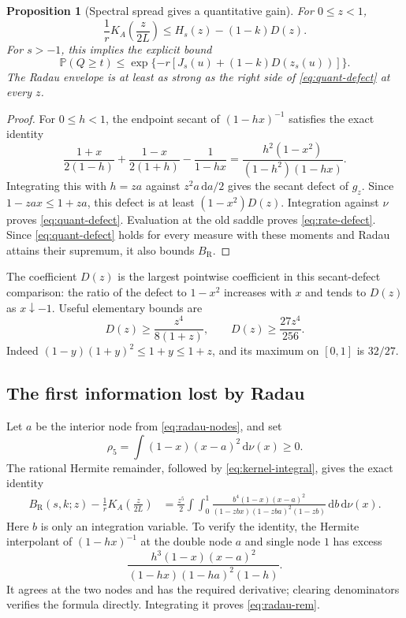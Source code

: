 \documentclass[11pt,letterpaper]{article}
\numberwithin{equation}{section}
\newtheorem{proposition}[theorem]{Proposition}
\theoremstyle{definition}\newtheorem{definition}[theorem]{Definition}
\theoremstyle{remark}\newtheorem{remark}[theorem]{Remark}
\newcommand{\PP}{\mathbb P}
\newcommand{\dd}{\,\mathrm d}
\newcommand{\bRad}{B_{\mathrm R}}
\begin{document}
\begin{proposition}[Spectral spread gives a quantitative gain]
\label{prop:defect}
For $0\le z<1$,
\begin{equation}\label{eq:quant-defect}
 \frac1r K_A\left(\frac z{2L}\right)
 \le H_s(z)-(1-k)D(z).
\end{equation}
For $s>-1$, this implies the explicit bound
\begin{equation}\label{eq:rate-defect}
 \PP(Q\ge t)\le
 \exp\{-r[J_s(u)+(1-k)D(z_s(u))]\}.
\end{equation}
The Radau envelope is at least as strong as the right side of
\eqref{eq:quant-defect} at every $z$.
\end{proposition}
\begin{proof}
For $0\le h<1$, the endpoint secant of $(1-hx)^{-1}$ satisfies
the exact identity
\[
 \frac{1+x}{2(1-h)}+\frac{1-x}{2(1+h)}-\frac1{1-hx}
 =\frac{h^2(1-x^2)}{(1-h^2)(1-hx)}.
\]
Integrating this with $h=za$ against $z^2a\dd a/2$ gives the
secant defect of $g_z$. Since $1-zax\le1+za$, this defect is at least
$(1-x^2)D(z)$. Integration against $\nu$ proves
\eqref{eq:quant-defect}. Evaluation at the old saddle proves
\eqref{eq:rate-defect}. Since \eqref{eq:quant-defect} holds for every
measure with these moments and Radau attains their supremum, it also
bounds $\bRad$.
\end{proof}
The coefficient $D(z)$ is the largest pointwise coefficient in
this secant-defect comparison: the ratio of the defect to $1-x^2$
increases with $x$ and tends to $D(z)$ as $x\downarrow-1$.
Useful elementary bounds are
\begin{equation}
 D(z)\ge\frac{z^4}{8(1+z)},\qquad
 D(z)\ge\frac{27z^4}{256}.
\end{equation}
Indeed $(1-y)(1+y)^2\le1+y\le1+z$, and its maximum on $[0,1]$
is $32/27$.

\subsection{The first information lost by Radau}
Let $a$ be the interior node from \eqref{eq:radau-nodes}, and set
\begin{equation}
 \rho_5=\int(1-x)(x-a)^2\dd\nu(x)\ge0.
\end{equation}
The rational Hermite remainder, followed by
\eqref{eq:kernel-integral}, gives the exact identity
\begin{align}\label{eq:radau-rem}
 \bRad(s,k;z)-\frac1rK_A\left(\frac z{2L}\right)
 &=\frac{z^5}{2}\int\!\int_0^1
 \frac{b^4(1-x)(x-a)^2}
 {(1-zbx)(1-zba)^2(1-zb)}\dd b\dd\nu(x).
\end{align}
Here $b$ is only an integration variable. To verify the identity,
the Hermite interpolant of $(1-hx)^{-1}$ at the double node $a$ and
single node $1$ has excess
\[
 \frac{h^3(1-x)(x-a)^2}{(1-hx)(1-ha)^2(1-h)}.
\]
It agrees at the two nodes and has the required derivative; clearing
denominators verifies the formula directly. Integrating it proves
\eqref{eq:radau-rem}.
\end{document}
